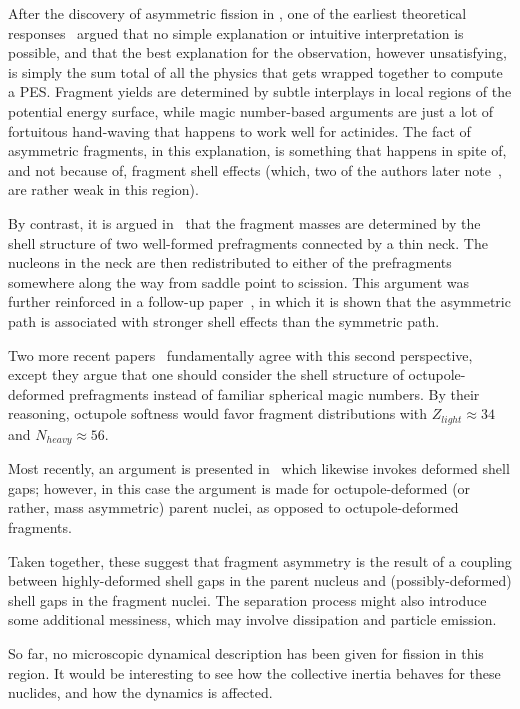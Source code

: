 After the discovery of asymmetric fission in {\Hg}, one of the earliest theoretical responses~\cite{Moller2012} argued that no simple explanation or intuitive interpretation is possible, and that the best explanation for the observation, however unsatisfying, is simply the sum total of all the physics that gets wrapped together to compute a PES. Fragment yields are determined by subtle interplays in local regions of the potential energy surface, while magic number-based arguments are just a lot of fortuitous hand-waving that happens to work well for actinides. The fact of asymmetric fragments, in this explanation, is something that happens in spite of, and not because of, fragment shell effects (which, two of the authors later note~\cite{Ichikawa2012}, are rather weak in this region).

By contrast, it is argued in~\cite{Warda2012a} that the fragment masses are determined by the shell structure of two well-formed prefragments connected by a thin neck. The nucleons in the neck are then redistributed to either of the prefragments somewhere along the way from saddle point to scission. This argument was further reinforced in a follow-up paper~\cite{Mcdonnell2014}, in which it is shown that the asymmetric path is associated with stronger shell effects than the symmetric path.

Two more recent papers~\cite{Scamps2018a, scamps2019} fundamentally agree with this second perspective, except they argue that one should consider the shell structure of octupole-deformed prefragments instead of familiar spherical magic numbers. By their reasoning, octupole softness would favor fragment distributions with $Z_{light}\approx34$ and $N_{heavy}\approx56$.

Most recently, an argument is presented in~\cite{Ichikawa2019} which likewise invokes deformed shell gaps; however, in this case the argument is made for octupole-deformed (or rather, mass asymmetric) parent nuclei, as opposed to octupole-deformed fragments.

Taken together, these suggest that fragment asymmetry is the result of a coupling between highly-deformed shell gaps in the parent nucleus and (possibly-deformed) shell gaps in the fragment nuclei. The separation process might also introduce some additional messiness, which may involve dissipation and particle emission.

So far, no microscopic dynamical description has been given for fission in this region. It would be interesting to see how the collective inertia behaves for these nuclides, and how the dynamics is affected.

